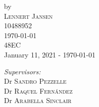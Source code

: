 \documentclass{report}
\begin{document}
{\begin{titlepage}




by\\[0.2cm]

\textsc{\Large Lennert Jansen}\\[0.2cm] %

10488952\\[1cm]










{\Large \today}\\[1cm] %



48EC\\ %

January 11, 2021 - \today\\[1cm]%






\begin{minipage}[t]{0.4\textwidth}

\begin{flushleft} \large

\emph{Supervisors:} \\

Dr \textsc{Sandro Pezzelle} \\ Dr \textsc{Raquel Fernández} \\ Dr \textsc{Arabella Sinclair}%

\end{flushleft}

\end{minipage}

~

\begin{minipage}[t]{0.4\textwidth}


\end{minipage}
\end{titlepage}}
\end{document}
